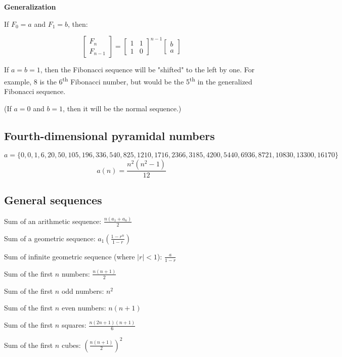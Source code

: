 \textbf{Generalization}

If $F_0 = a$ and $F_1 = b$, then:

\begin{equation*}
    \begin{bmatrix}
        F_n \\
        F_{n-1}
    \end{bmatrix}
    =
    \begin{bmatrix}
        1 & 1 \\
        1 & 0
    \end{bmatrix}
    ^{n-1}
    \begin{bmatrix}
        b \\
        a
    \end{bmatrix}
\end{equation*}

If $a = b = 1$, then the Fibonacci sequence will be "shifted" to the left by one. For example, 8 is the 6\textsuperscript{th} Fibonacci number, but would be the 5\textsuperscript{th} in the generalized Fibonacci sequence.

(If $a = 0$ and $b = 1$, then it will be the normal sequence.)

\subsection*{Fourth-dimensional pyramidal numbers}

$a = \{0, 0, 1, 6, 20, 50, 105, 196, 336, 540, 825, 1210, 1716, 2366, 3185, 4200, 5440, 6936, 8721, 10830, 13300, 16170\}$
$$a(n) = \frac{n^2(n^2 - 1)}{12}$$

\subsection*{General sequences}

Sum of an arithmetic sequence: $\frac{n(a_1 + a_n)}{2}$

Sum of a geometric sequence: $a_1 ( \frac{1 - r^n}{1 - r} )$

Sum of infinite geometric sequence (where $|r| < 1$): $\frac{a}{1 - r}$

Sum of the first $n$ numbers: $\frac{n(n+1)}{2}$

Sum of the first $n$ odd numbers: $n^2$

Sum of the first $n$ even numbers: $n(n+1)$

Sum of the first $n$ squares: $\frac{n (2n+1) (n+1)}{6}$

Sum of the first $n$ cubes: $( \frac{n(n+1)}{2}) ^2$

